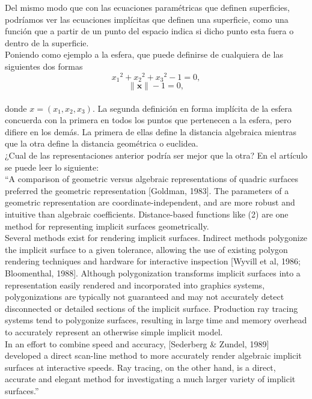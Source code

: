 Del mismo modo que con las ecuaciones paramétricas que definen superficies, podríamos ver las ecuaciones implícitas que definen una superficie, como una función que a partir de un punto del espacio indica si dicho punto esta fuera o dentro de la superficie.
${ }$\\

Poniendo como ejemplo a la esfera, que puede definirse de cualquiera de las siguientes dos formas
${ }$\\
$$ {x_1}^2 + {x_2}^2 + {x_3}^2 -1 = 0, $$
$$ \lVert \mathbf{x} \rVert -1 = 0, $$
${ }$\\
donde $x = (x_1, x_2, x_3)$. La segunda definición en forma implícita de la esfera concuerda con la primera en todos los puntos que pertenecen a la esfera, pero difiere en los demás. La primera de ellas define la distancia algebraica mientras que la otra define la distancia geométrica o euclidea.
${ }$\\

¿Cual de las representaciones anterior podría ser mejor que la otra? En el artículo \cite{JHart} se puede leer lo siguiente:
${ }$\\

``A comparison of geometric versus algebraic representations of quadric surfaces preferred the geometric representation [Goldman, 1983]. The parameters of a geometric representation are coordinate-independent, and are more robust and intuitive than algebraic coefficients. Distance-based functions like (2) are one method for representing implicit surfaces geometrically.
${ }$\\

Several methods exist for rendering implicit surfaces. Indirect methods polygonize the implicit surface to a given tolerance, allowing the use of existing polygon rendering techniques and hardware for interactive inspection [Wyvill et al, 1986; Bloomenthal, 1988]. Although polygonization transforms implicit surfaces into a representation easily rendered and incorporated into graphics systems, polygonizations are typically not guaranteed and may not accurately detect disconnected or detailed sections of the implicit surface. Production ray tracing systems tend to polygonize surfaces, resulting in large time and memory overhead to accurately represent an otherwise simple implicit model.
${ }$\\

In an effort to combine speed and accuracy, [Sederberg \& Zundel, 1989] developed a direct scan-line method to more accurately render algebraic implicit surfaces at interactive speeds. Ray tracing, on the other hand, is a direct, accurate and elegant method for investigating a much larger variety of implicit surfaces.''
${ }$\\

